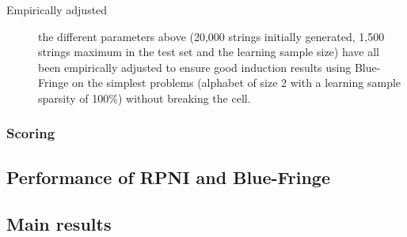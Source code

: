 \begin{description}
\item[Empirically adjusted] the different parameters above (20,000 strings initially generated, 1,500 strings maximum in the test set and the learning sample size) have all been empirically adjusted to ensure good induction results using Blue-Fringe on the simplest problems (alphabet of size 2 with a learning sample sparsity of 100\%) without breaking the cell.

\end{description}

\subsubsection{Scoring}

\subsection{Performance of RPNI and Blue-Fringe\label{subsection_stamina_baseline}}

\subsection{Main results\label{subsection_stamina_results}}

